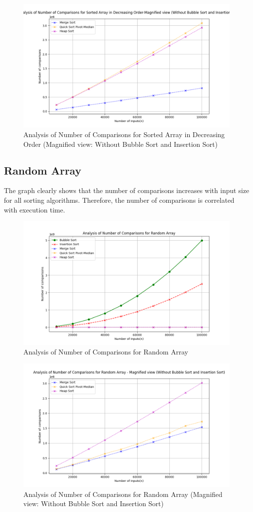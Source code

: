 \documentclass[a4paper,12pt]{report}
\begin{document}
\begin{figure}[H]
	\centering
	\includegraphics[width=.9\textwidth]{./Comparison_Decreasing_Magnified.png}
	\caption{Analysis of Number of Comparisons for  Sorted Array in Decreasing Order (Magnified view: Without Bubble Sort and Insertion Sort)}
	\label{fig:ComparisonsortingDecreasing}
\end{figure}

\subsection{Random Array}
The graph clearly shows that the number of comparisons increases with input size for all sorting algorithms. Therefore, the number of comparisons is correlated with execution time.
\begin{figure}[H]
	\centering
	\includegraphics[width=.9\textwidth]{./Comparison_Random.png}
	\caption{Analysis of Number of Comparisons for Random Array}
	\label{fig:ComparisonRandom}
\end{figure}

\begin{figure}[H]
	\centering
	\includegraphics[width=.9\textwidth]{./Comparison_Random_Magnified.png}
	\caption{Analysis of Number of Comparisons for  Random Array (Magnified view: Without Bubble Sort and Insertion Sort)}
	\label{fig:ComparisonsortingRandom}
\end{figure}
\end{document}
